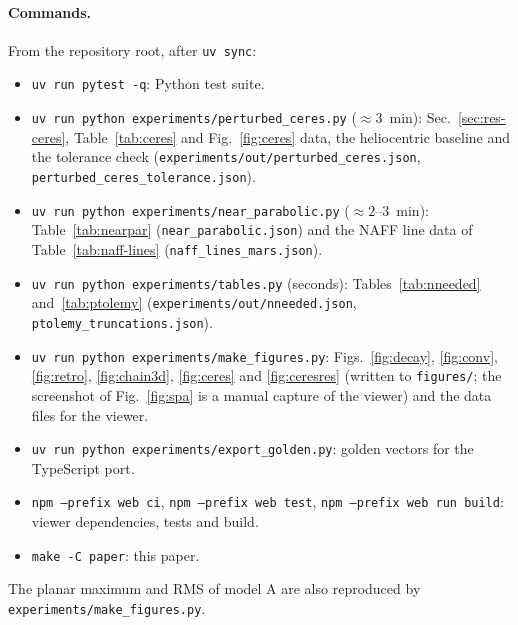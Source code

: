 \paragraph*{Commands.}
From the repository root, after \texttt{uv sync}:
\begin{itemize}
\item \texttt{uv run pytest -q}: Python test suite.
\item \texttt{uv run python experiments/\allowbreak perturbed\_\allowbreak ceres.py} ($\approx3$~min):
Sec.~\ref{sec:res-ceres}, Table~\ref{tab:ceres} and Fig.~\ref{fig:ceres}
data, the heliocentric baseline and the tolerance check
(\texttt{experiments/\allowbreak out/perturbed\_\allowbreak ceres.json},
\texttt{perturbed\_\allowbreak ceres\_\allowbreak tolerance.json}).
\item \texttt{uv run python experiments/\allowbreak near\_\allowbreak parabolic.py} ($\approx2$--$3$~min):
Table~\ref{tab:nearpar} (\texttt{near\_\allowbreak parabolic.json}) and the NAFF line data of
Table~\ref{tab:naff-lines} (\texttt{naff\_\allowbreak lines\_\allowbreak mars.json}).
\item \texttt{uv run python experiments/\allowbreak tables.py} (seconds):
Tables~\ref{tab:nneeded} and~\ref{tab:ptolemy}
(\texttt{experiments/\allowbreak out/\allowbreak nneeded.json},
\texttt{ptolemy\_\allowbreak truncations.json}).
\item \texttt{uv run python experiments/\allowbreak make\_\allowbreak figures.py}: Figs.~\ref{fig:decay},
\ref{fig:conv}, \ref{fig:retro}, \ref{fig:chain3d}, \ref{fig:ceres} and
\ref{fig:ceresres} (written to \texttt{figures/}; the screenshot of
Fig.~\ref{fig:spa} is a manual capture of the viewer) and the data files for the viewer.
\item \texttt{uv run python experiments/\allowbreak export\_\allowbreak golden.py}: golden vectors for the
TypeScript port.
\item \texttt{npm --prefix web ci}, \texttt{npm --prefix web test},
\texttt{npm --prefix web run build}: viewer dependencies, tests and build.
\item \texttt{make -C paper}: this paper.
\end{itemize}
The planar maximum and RMS of model A are also reproduced by
\texttt{experiments/make\_figures.py}.
